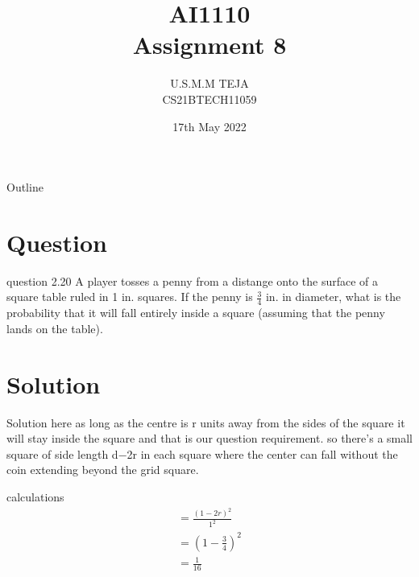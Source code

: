 \documentclass{beamer}
\title{AI1110 \\ Assignment 8}
\author{U.S.M.M TEJA \\ CS21BTECH11059}
\date{17th May 2022}
\begin{document}
	\begin{frame}
		\titlepage
	\end{frame}
	
	\begin{frame}{Outline}
    		\tableofcontents
	\end{frame}
	
	\section{Question}
	\begin{frame}{question 2.20}
A player tosses a penny from a distange onto the surface of a square table ruled in 1 in.
squares. If the penny is $\frac{3}{4}$ in. in diameter, what is the probability that it will fall entirely
inside a square (assuming that the penny lands on the table).
	\end{frame}
	
	\section{Solution}
	\begin{frame}{Solution}
here as long as the centre is r units away from the sides of the square it will stay inside the square and that is our question requirement.
so there's a small square of side length d−2r in each square where the center can fall without the coin extending beyond the grid square.
    \end{frame}

\begin{frame}{calculations}
 \begin{align}
    & =\frac{(1-2r)^2}{1^2} & \\
    & = (1 - \frac{3}{4})^2& \\
    & = \frac{1}{16}&
\end{align}   
\end{frame}
\end{document}
